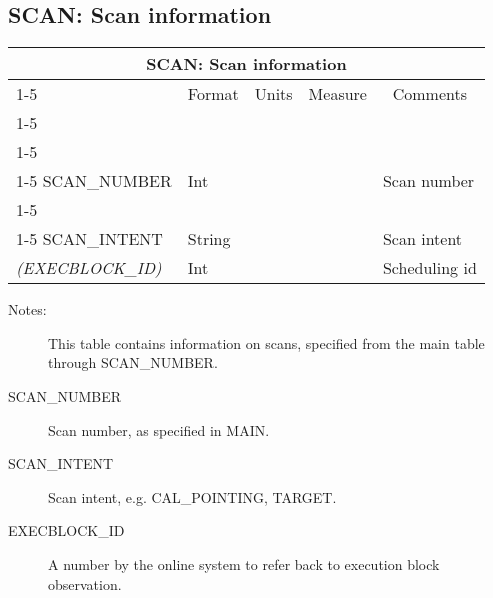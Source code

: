 \documentclass{article}
\newcommand{\defline}[1]{\cline{1-5}
\multicolumn{5}{|l|}{#1} \\
\cline{1-5}}
\newcommand{\definetable}[2]
{
	\vfill\newpage
	\subsection{#1}
        \vspace{0.15in}
        \small
	\begin{tabular}{|l|p{1.25in}|l|p{.9in}|p{1.4in}|}
	\hline
	\multicolumn{5}{|c|}{\bf #1}\\ 
	\cline{1-5}
        \multicolumn{1}{|c|}{Name}&\multicolumn{1}{|c|}{Format}&
        \multicolumn{1}{|c|}{Units}&\multicolumn{1}{|c|}{Measure}&
        \multicolumn{1}{|c|}{Comments}\\
        \cline{1-5}
        #2
        \hline
	\end{tabular}
}
\begin{document}
\definetable{SCAN: Scan information}{
\defline{\bf Columns}
\defline{\em Key}
SCAN\_NUMBER &      Int &    &      & Scan number\\
\defline{\em Data}  
SCAN\_INTENT &  String & & & Scan intent\\
{\it (EXECBLOCK\_ID)} & Int &    &      & Scheduling id\\
}
\begin{description}

\item[Notes:] This table contains information on scans, specified from the main
table through SCAN\_NUMBER.

\item[SCAN\_NUMBER] Scan number, as specified in MAIN.

\item[SCAN\_INTENT] Scan intent, e.g. CAL\_POINTING, TARGET.

\item[EXECBLOCK\_ID] A number by the online system to refer back to execution block observation.

\end{description}
\end{document}
